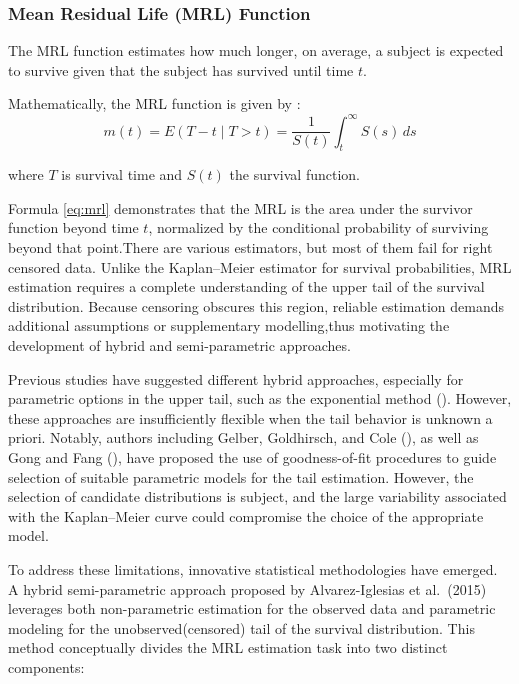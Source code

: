 \documentclass[
  onecolumn]{article}
\begin{document}
\subsubsection{Mean Residual Life (MRL)
Function}\label{mean-residual-life-mrl-function}

The MRL function estimates how much longer, on average, a subject is
expected to survive given that the subject has survived until time
\(t\).

Mathematically, the MRL function is given by : \begin{equation}
m(t) = E(T - t \mid T > t) = \frac{1}{S(t)} \int_t^\infty S(s) \, ds \label{eq:mrl}
\end{equation}

where \(T\) is survival time and \(S(t)\) the survival function.

Formula \ref{eq:mrl} demonstrates that the MRL is the area under the
survivor function beyond time \(t\), normalized by the conditional
probability of surviving beyond that point.There are various estimators,
but most of them fail for right censored data. Unlike the Kaplan--Meier
estimator for survival probabilities, MRL estimation requires a complete
understanding of the upper tail of the survival distribution. Because
censoring obscures this region, reliable estimation demands additional
assumptions or supplementary modelling,thus motivating the development
of hybrid and semi-parametric approaches.

Previous studies have suggested different hybrid approaches, especially
for parametric options in the upper tail, such as the exponential method
(\citet{suNovelMethodCalculate2012}). However, these approaches are
insufficiently flexible when the tail behavior is unknown a priori.
Notably, authors including Gelber, Goldhirsch, and Cole
(\citet{gelberParametricExtrapolationSurvival1993}), as well as Gong and
Fang (\citet{gongAsymptoticPropertiesMean2012}), have proposed the use
of goodness-of-fit procedures to guide selection of suitable parametric
models for the tail estimation. However, the selection of candidate
distributions is subject, and the large variability associated with the
Kaplan--Meier curve could compromise the choice of the appropriate
model.

To address these limitations, innovative statistical methodologies have
emerged. A hybrid semi-parametric approach proposed by Alvarez-Iglesias
et al.~(2015) leverages both non-parametric estimation for the observed
data and parametric modeling for the unobserved(censored) tail of the
survival distribution. This method conceptually divides the MRL
estimation task into two distinct components:
\end{document}
